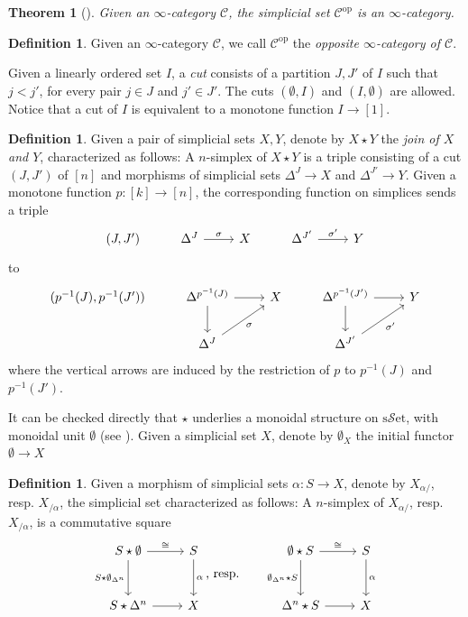 \documentclass[a4paper]{book}
\newcommand{\lC}{\mathcal{C}}
\newcommand{\lS}{\mathcal{S}}
\newcommand{\op}{\mathrm{op}}
\newcommand{\set}{\lS\mathrm{et}} %
\newcommand{\sset}{\mathrm{s}\set} %
\newtheorem{theorem}[equation]{Theorem}
\theoremstyle{definition}
\newtheorem{definition}[equation]{Definition}
\theoremstyle{remark}
\numberwithin{equation}{section}
\begin{document}
\begin{theorem}[{\cite[Tag 003S]{kerodon2026}}]
Given an $\infty$-category $\lC$, the simplicial set $\lC^\op$ is an $\infty$-category. 
\end{theorem} 
\begin{definition}
	Given an $\infty$-category $\lC$, we call $\lC^\op$ the \emph{opposite $\infty$-category of $\lC$}. 
\end{definition}
Given a linearly ordered set $I$, a \emph{cut} consists of a partition $J,J'$ of $I$ such that $j<j'$, for every pair $j\in J$ and $j'\in J'$. The cuts $(\emptyset,I)$ and $(I,\emptyset)$ are allowed. Notice that a cut of $I$ is equivalent to a monotone function $I\to[1]$. 
\begin{definition}
	Given a pair of simplicial sets $X,Y$, denote by $X\star Y$ the \emph{join of $X$ and $Y$}, characterized as follows: A $n$-simplex of $X\star Y$ is a triple consisting of a cut $(J,J')$ of $[n]$ and morphisms of simplicial sets $\Delta^{J}\to X$ and $\Delta^{J'}\to Y$. Given a monotone function $p:[k]\to[n]$, the corresponding function on simplices sends a triple \begin{equation}
		\begin{tikzcd}
			(J,J') & \Delta^{J} \arrow[r,"\sigma"] & X & \Delta^{J'} \arrow[r,"\sigma'"] & Y
		\end{tikzcd}
	\end{equation}to
	\begin{equation}
		\begin{tikzcd}
			(p^{-1}(J),p^{-1}(J')) & \Delta^{p^{-1}(J)} \arrow[d]\arrow[r] & X & \Delta^{p^{-1}(J')} \arrow[d]\arrow[r] & Y\\
			& \Delta^{J} \arrow[ru,"\sigma"'] & & \Delta^{J'} \arrow[ru,"\sigma'"']
		\end{tikzcd}
	\end{equation}where the vertical arrows are induced by the restriction of $p$ to $p^{-1}(J)$ and $p^{-1}(J')$. 
\end{definition}
It can be checked directly that $\star$ underlies a monoidal structure on $\sset$, with monoidal unit $\emptyset$ (see \cite[Tag 016K]{kerodon2026}). Given a simplicial set $X$, denote by $\emptyset_X$ the initial functor $\emptyset\to X$
\begin{definition}
	Given a morphism of simplicial sets $\alpha:S\to X$, denote by $X_{\alpha/}$, resp. $X_{/\alpha}$, the simplicial set characterized as follows: A $n$-simplex of $X_{\alpha/}$, resp. $X_{/\alpha}$, is a commutative square \begin{equation}
		\begin{tikzcd}[row sep=1cm]
			S\star\emptyset\arrow[r,"\cong"]\arrow[d,"S\star\emptyset_{\Delta^n}"'] & S \arrow[d,"\alpha"]  \\
			S\star\Delta^n \arrow[r] & X
		\end{tikzcd}\text{, resp.}\qquad
		\begin{tikzcd}[row sep=1cm]
			\emptyset\star S \arrow[r,"\cong"]\arrow[d,"\emptyset_{\Delta^n}\star S"'] & S \arrow[d,"\alpha"] \\
			\Delta^n\star S \arrow[r] & X
		\end{tikzcd}
	\end{equation}
\end{definition}
\end{document}
